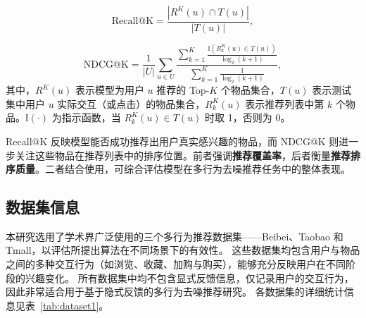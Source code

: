 \begin{equation}
    \text{Recall@K} = 
    \frac{|R^{K}(u) \cap T(u)|}{|T(u)|},
\end{equation}

\begin{equation}
    \text{NDCG@K} = 
    \frac{1}{|U|} 
    \sum_{u \in U} 
    \frac{
        \sum_{k=1}^{K} 
        \frac{
            \mathbb{I}\left(R^K_k(u) \in T(u)\right)
        }{
            \log_2(k + 1)
        }
    }{
        \sum_{k=1}^{K} 
        \frac{1}{
            \log_2(k + 1)
        }
    },
\end{equation}
其中，$R^K(u)$ 表示模型为用户 $u$ 推荐的 Top-$K$ 个物品集合，$T(u)$ 表示测试集中用户 $u$ 实际交互（或点击）的物品集合，$R^K_k(u)$ 表示推荐列表中第 $k$ 个物品。$\mathbb{I}(\cdot)$ 为指示函数，当 $R^K_k(u) \in T(u)$ 时取 1，否则为 0。

Recall@K 反映模型能否成功推荐出用户真实感兴趣的物品，而 NDCG@K 则进一步关注这些物品在推荐列表中的排序位置。前者强调\textbf{推荐覆盖率}，后者衡量\textbf{推荐排序质量}。二者结合使用，可综合评估模型在多行为去噪推荐任务中的整体表现。


\begin{table}
\centering
\caption{数据集的统计信息}
\renewcommand{\arraystretch}{1.0}
\label{tab:dataset1}
\end{table}

\subsection{数据集信息}
本研究选用了学术界广泛使用的三个多行为推荐数据集——Beibei、Taobao 和 Tmall，以评估所提出算法在不同场景下的有效性。  
这些数据集均包含用户与物品之间的多种交互行为（如浏览、收藏、加购与购买），能够充分反映用户在不同阶段的兴趣变化。  
所有数据集中均不包含显式反馈信息，仅记录用户的交互行为，因此非常适合用于基于隐式反馈的多行为去噪推荐研究。  
各数据集的详细统计信息见表~\ref{tab:dataset1}。


